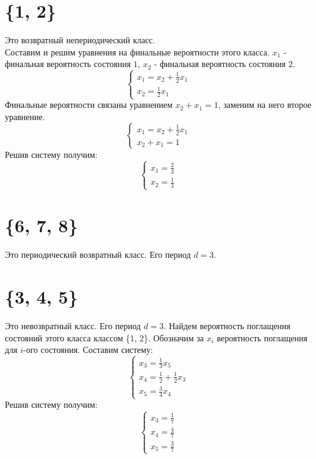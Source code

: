 \documentclass [a4paper,12pt]{article}
\begin{document}
\section{\{1, 2\}}
Это возвратный непериодический класс.\\
Составим и решим уравнения на финальные вероятности этого класса. $x_1$ - финальная вероятность состояния $1$, $x_2$ - финальная вероятность состояния $2$.\\
\begin{equation*}
 \begin{cases}
   x_1=x_2+\frac{1}{2}x_1
   \\
   x_2 =\frac{1}{2}x_1
 \end{cases}
\end{equation*}
Финальные вероятности связаны уравнением  $x_2 + x_1 = 1$, заменим на него второе уравнение.\\
\begin{equation*}
 \begin{cases}
   x_1=x_2+\frac{1}{2}x_1
   \\
   x_2 + x_1 = 1
 \end{cases}
\end{equation*}
Решив систему получим:\\
\begin{equation*}
 \begin{cases}
   x_1=\frac{2}{3}
   \\
   x_2=\frac{1}{3}
 \end{cases}
\end{equation*}
\section{\{6, 7, 8\}}
Это периодический возвратный класс. Его период $d=3$.\\
\section{\{3, 4, 5\}}
Это невозвратный класс. Его период $d=3$. Найдем вероятность поглащения состояний этого класса классом \{1, 2\}. Обозначим за $x_i$ вероятность поглащения для $i$-ого состояния. Составим систему:\\
\begin{equation*}
 \begin{cases}
  x_3=\frac{1}{3}x_5
   \\
   x_4=\frac{1}{2} + \frac{1}{2}x_3
   \\
   x_5=\frac{3}{4}x_4
 \end{cases}
\end{equation*}
Решив систему получим:\\
\begin{equation*}
 \begin{cases}
  x_3=\frac{1}{7}
   \\
   x_4=\frac{4}{7}
   \\
   x_5=\frac{3}{7}
 \end{cases}
\end{equation*}
\end{document}
